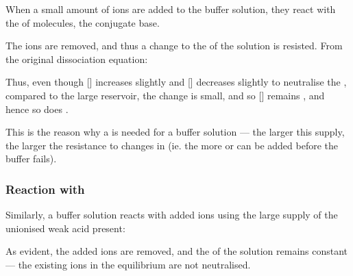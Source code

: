 				When a small amount of  ions are added to the buffer solution, they react with the  of
				 molecules, the conjugate base.


				The  ions are removed, and thus a change to the \pH{} of the solution is resisted. From the original dissociation
				equation:


				Thus, even though [] increases slightly and [] decreases slightly to neutralise the , compared
				to the large reservoir, the change is small, and so [] remains , and hence so does \pH{}.

				This is the reason why a  is needed for a buffer solution --- the larger this supply, the larger the
				resistance to changes in \pH{} (ie. the more  or  can be added before the buffer fails).




			\subsubsection{Reaction with }

				Similarly, a buffer solution reacts with added  ions using the large supply of the unionised weak acid present:


				As evident, the added  ions are removed, and the \pH{} of the solution remains constant --- the existing  ions
				in the equilibrium are not neutralised.

